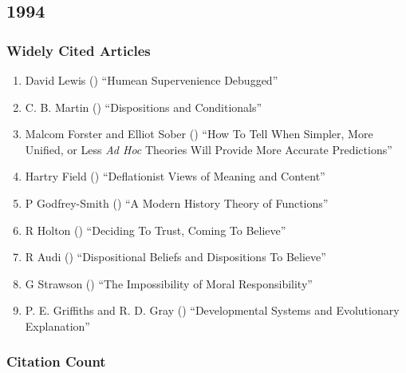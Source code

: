 \documentclass[
  10pt,
  letterpaper,
  DIV=11,
  numbers=noendperiod,
  twoside]{scrartcl}
\providecommand{\tightlist}{%
  \setlength{\itemsep}{0pt}\setlength{\parskip}{0pt}}\usepackage{longtable,booktabs,array}
\begin{document}
\newpage

\subsection{1994}\label{sec-s1994}

\subsubsection*{Widely Cited Articles}\label{widely-cited-articles-37}

\begin{enumerate}
\def\labelenumi{\arabic{enumi}.}
\tightlist
\item
  David Lewis () ``Humean
  Supervenience Debugged''
\item
  C. B. Martin () ``Dispositions
  and Conditionals''
\item
  Malcom Forster and Elliot Sober
  () ``How To Tell When Simpler,
  More Unified, or Less \emph{Ad Hoc} Theories Will Provide More
  Accurate Predictions''
\item
  Hartry Field () ``Deflationist
  Views of Meaning and Content''
\item
  P Godfrey-Smith () ``A Modern
  History Theory of Functions''
\item
  R Holton () ``Deciding To
  Trust, Coming To Believe''
\item
  R Audi () ``Dispositional
  Beliefs and Dispositions To Believe''
\item
  G Strawson () ``The
  Impossibility of Moral Responsibility''
\item
  P. E. Griffiths and R. D. Gray
  () ``Developmental Systems and
  Evolutionary Explanation''
\end{enumerate}

\subsubsection*{Citation Count}\label{sec-count-1994}
\end{document}
